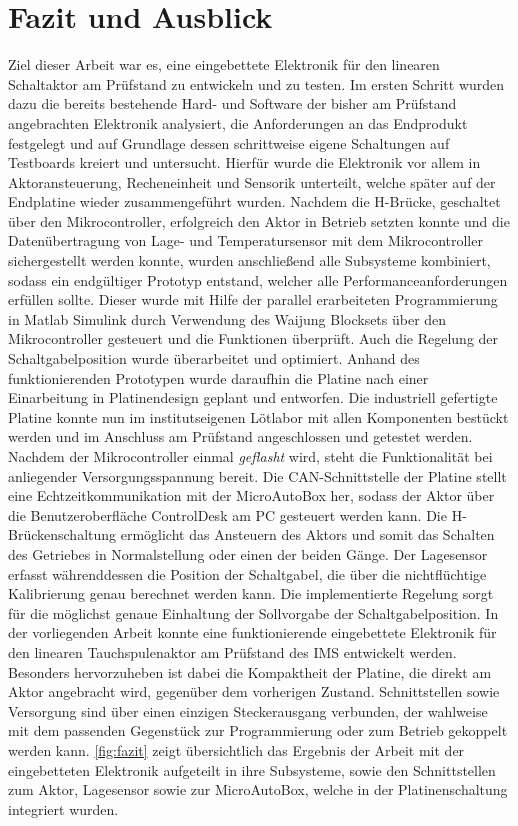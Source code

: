 \chapter{Fazit und Ausblick}\label{kap8}
Ziel dieser Arbeit war es, eine eingebettete Elektronik für den linearen Schaltaktor am Prüfstand zu entwickeln und zu testen. Im ersten Schritt wurden dazu die bereits bestehende Hard- und Software der bisher am Prüfstand angebrachten Elektronik analysiert, die Anforderungen an das Endprodukt festgelegt und auf Grundlage dessen schrittweise eigene Schaltungen auf Testboards kreiert und untersucht. Hierfür wurde die Elektronik vor allem in Aktoransteuerung, Recheneinheit und Sensorik unterteilt, welche später auf der Endplatine wieder zusammengeführt wurden. Nachdem die H-Brücke, geschaltet über den Mikrocontroller, erfolgreich den Aktor in Betrieb setzten konnte und die Datenübertragung von Lage- und Temperatursensor mit dem Mikrocontroller sichergestellt werden konnte, wurden anschließend alle Subsysteme kombiniert, sodass ein endgültiger Prototyp entstand, welcher alle Performanceanforderungen erfüllen sollte. Dieser wurde mit Hilfe der parallel erarbeiteten Programmierung in Matlab Simulink durch Verwendung des Waijung Blocksets über den Mikrocontroller gesteuert und die Funktionen überprüft. Auch die Regelung der Schaltgabelposition wurde überarbeitet und optimiert.
Anhand des funktionierenden Prototypen wurde daraufhin die Platine nach einer Einarbeitung in Platinendesign geplant und entworfen. Die industriell gefertigte Platine konnte nun im institutseigenen Lötlabor mit allen Komponenten bestückt werden und im Anschluss am Prüfstand angeschlossen und getestet werden.
Nachdem der Mikrocontroller einmal \textit{geflasht} wird, steht die Funktionalität bei anliegender Versorgungsspannung bereit. Die CAN-Schnittstelle der Platine stellt eine Echtzeitkommunikation mit der MicroAutoBox her, sodass der Aktor über die Benutzeroberfläche ControlDesk am PC gesteuert werden kann. Die H-Brückenschaltung ermöglicht das Ansteuern des Aktors und somit das Schalten des Getriebes in Normalstellung oder einen der beiden Gänge. Der Lagesensor erfasst währenddessen die Position der Schaltgabel, die über die nichtflüchtige Kalibrierung genau berechnet werden kann. Die implementierte Regelung sorgt für die möglichst genaue Einhaltung der Sollvorgabe der Schaltgabelposition.
In der vorliegenden Arbeit konnte eine funktionierende eingebettete Elektronik für den linearen Tauchspulenaktor am Prüfstand des IMS entwickelt werden. Besonders hervorzuheben ist dabei die Kompaktheit der Platine, die direkt am Aktor angebracht wird, gegenüber dem vorherigen Zustand. Schnittstellen sowie Versorgung sind über einen einzigen Steckerausgang verbunden, der wahlweise mit dem passenden Gegenstück zur Programmierung oder zum Betrieb gekoppelt werden kann. \autoref{fig:fazit} zeigt übersichtlich das Ergebnis der Arbeit mit der eingebetteten Elektronik aufgeteilt in ihre Subsysteme, sowie den Schnittstellen zum Aktor, Lagesensor sowie zur MicroAutoBox, welche in der Platinenschaltung integriert wurden. 


